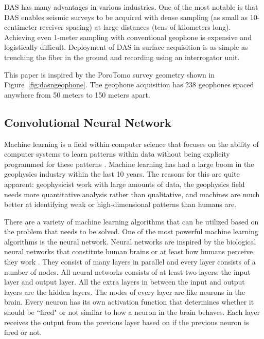 DAS has many advantages in various industries. One of the most notable is that DAS enables seismic surveys to be acquired with dense sampling (as small as 10-centimeter receiver spacing) at large distances (tens of kilometers long). Achieving even 1-meter sampling with conventional geophone is expensive and logistically difficult. Deployment of DAS in surface acquisition is as simple as trenching the fiber in the ground and recording using an interrogator unit.

This paper is inspired by the PoroTomo survey geometry shown in Figure~\ref{fig:dasngeophone}. The geophone acquisition has 238 geophones spaced anywhere from 50 meters to 150 meters apart. 



\subsection{Convolutional Neural Network}
Machine learning is a field within computer science that focuses on the ability of computer systems to learn patterns within data without being explicity programmed for these patterns \citep{samuel1959some}. Machine learning has had a large boom in the geophysics industry within the last 10 years. The reasons for this are quite apparent: geophysicist work with large amounts of data, the geophysics field needs more quantitative analysis rather than qualitative, and machines are much better at identifying weak or high-dimensional patterns than humans are.

There are a variety of machine learning algorithms that can be utilized based on the problem that needs to be solved. One of the most powerful machine learning algorithms is the neural network. Neural networks are inspired by the biological neural networks that constitute human brains or at least how humans perceive they work \citep{Gerven2018}. They consist of many layers in parallel and every layer consists of a number of nodes. All neural networks consists of at least two layers: the input layer and output layer. All the extra layers in between the input and output layers are the hidden layers. The nodes of every layer are like neurons in the brain. Every neuron has its own activation function that determines whether it should be ``fired" or not similar to how a neuron in the brain behaves. Each layer receives the output from the previous layer based on if the previous neuron is fired or not.


